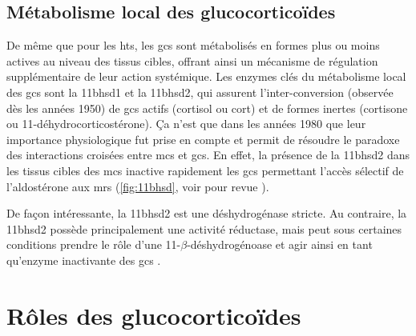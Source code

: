 \documentclass[../main.tex]{subfiles}
\begin{document}

\subsection{Métabolisme local des glucocorticoïdes}\label{subsec:local-gc-metabo}
De même que pour les \glspl{ht}, les \glspl{gc} sont métabolisés en formes plus ou moins actives au niveau des tissus cibles, offrant ainsi un mécanisme de régulation supplémentaire de leur action systémique.
Les enzymes clés du métabolisme local des \glspl{gc} sont la \gls{11bhsd1}  et la \gls{11bhsd2}, qui assurent l'inter-conversion (observée dès les années 1950) de \glspl{gc} actifs (cortisol ou \gls{cort}) et de formes inertes (cortisone ou 11-déhydrocorticostérone).
Ça n'est que dans les années 1980 que leur importance physiologique fut prise en compte \citep{Edwards1988,Funder1988} et permit de résoudre le paradoxe des interactions croisées entre \glspl{mc} et \glspl{gc}.
En effet, la présence de la \gls{11bhsd2} dans les tissus cibles des \glspl{mc} inactive rapidement les \glspl{gc} permettant l'accès sélectif de l'aldostérone aux \glspl{mr} (\autoref{fig:11bhsd}, voir pour revue \citealp{Seckl2001}).



De façon intéressante, la \gls{11bhsd2} est une déshydrogénase stricte.
Au contraire, la \gls{11bhsd2} possède principalement une activité réductase, mais peut sous certaines conditions prendre le rôle d'une 11-$\beta$-déshydrogénoase et agir ainsi en tant qu'enzyme inactivante des \glspl{gc} \citep{Phillips1989}.




\section{Rôles des glucocorticoïdes}

\end{document}
